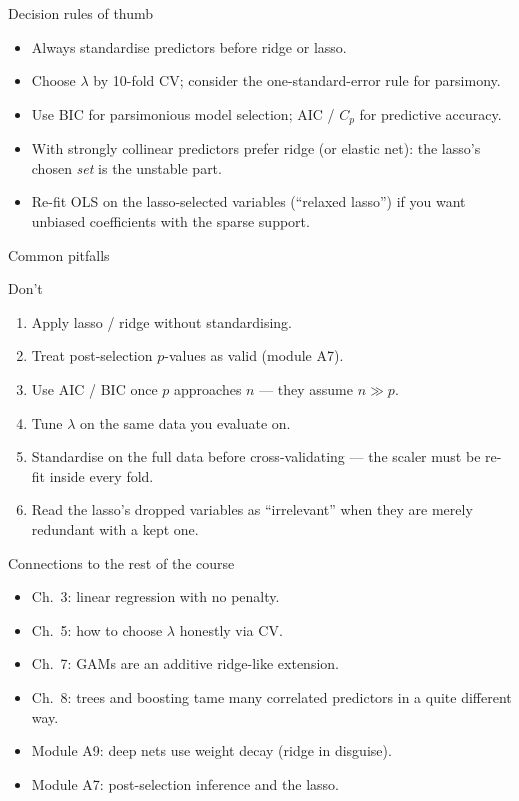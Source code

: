 \documentclass[aspectratio=169,11pt]{beamer}
\begin{document}
\begin{frame}{Decision rules of thumb}
  \begin{itemize}
    \item Always standardise predictors before ridge or lasso.
    \item Choose $\lambda$ by 10-fold CV; consider the
          one-standard-error rule for parsimony.
    \item Use BIC for parsimonious model selection; AIC / $C_p$ for
          predictive accuracy.
    \item With strongly collinear predictors prefer ridge (or elastic
          net): the lasso's chosen \emph{set} is the unstable part.
    \item Re-fit OLS on the lasso-selected variables (``relaxed lasso'')
          if you want unbiased coefficients with the sparse support.
  \end{itemize}
\end{frame}

\begin{frame}{Common pitfalls}
  \begin{alertblock}{Don't}
    \begin{enumerate}
      \item Apply lasso / ridge without standardising.
      \item Treat post-selection $p$-values as valid (module A7).
      \item Use AIC / BIC once $p$ approaches $n$ --- they assume
            $n \gg p$.
      \item Tune $\lambda$ on the same data you evaluate on.
      \item Standardise on the full data before cross-validating ---
            the scaler must be re-fit inside every fold.
      \item Read the lasso's dropped variables as ``irrelevant'' when
            they are merely redundant with a kept one.
    \end{enumerate}
  \end{alertblock}
\end{frame}

\begin{frame}{Connections to the rest of the course}
  \begin{itemize}
    \item Ch.~3: linear regression with no penalty.
    \item Ch.~5: how to choose $\lambda$ honestly via CV.
    \item Ch.~7: GAMs are an additive ridge-like extension.
    \item Ch.~8: trees and boosting tame many correlated predictors in a
          quite different way.
    \item Module A9: deep nets use weight decay (ridge in disguise).
    \item Module A7: post-selection inference and the lasso.
  \end{itemize}
\end{frame}
\end{document}
